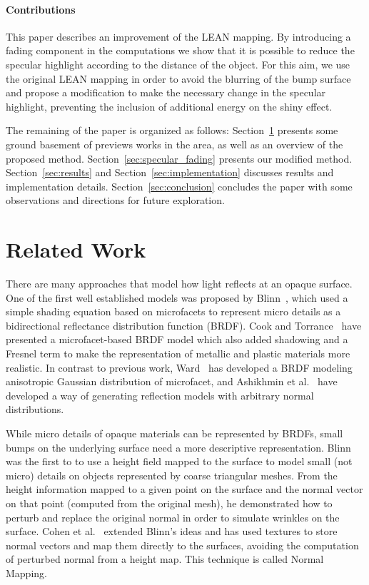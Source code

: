 \documentclass[10pt, conference]{IEEEtran}
\begin{document}
\paragraph*{Contributions}
%
This paper describes an improvement of the LEAN mapping. By introducing a fading component in the computations we show that it is possible to reduce the specular highlight according to the distance of the object. For this aim, we use the original LEAN mapping in order to avoid the blurring of the bump surface and propose a modification to make the necessary change in the specular highlight, preventing the inclusion of additional energy on the shiny effect.

The remaining of the paper is organized as follows: Section~\ref{sec:related_work} presents some ground basement of previews works in the area, as well as an overview of the proposed method. Section~\ref{sec:specular_fading} presents our modified method. Section~\ref{sec:results} and Section~\ref{sec:implementation} discusses results and implementation details. Section~\ref{sec:conclusion} concludes the paper with some observations and directions for future exploration.
\section{Related Work}
\label{sec:related_work}
%
There are many approaches that model how light reflects at an opaque surface. One of the first well established models was proposed by Blinn~\cite{Blinn:1977:MLR:563858.563893}, which used a simple shading equation based on microfacets to represent micro details as a bidirectional reflectance distribution function (BRDF). Cook and Torrance~\cite{Cook:1982:RMC:357290.357293} have presented a microfacet-based BRDF model which also added shadowing and a Fresnel term to make the representation of metallic and plastic materials more realistic. In contrast to previous work, Ward~\cite{Ward:1992:MMA:133994.134078} has developed a BRDF modeling anisotropic Gaussian distribution of microfacet, and Ashikhmin et al.~\cite{Ashikmin:2000:MBG:344779.344814}  have developed a way of generating reflection models with arbitrary normal distributions.

While micro details of opaque materials can be represented by BRDFs, small bumps on the underlying surface need a more descriptive representation. Blinn~\cite{Blinn:1978:SWS:800248.507101} was the first to to use a height field mapped to the surface to model small (not micro) details on objects represented by coarse triangular meshes. From the height information mapped to a given point on the surface and the normal vector on that point (computed from the original mesh), he demonstrated how to perturb and replace the original normal in order to simulate wrinkles on the surface. Cohen et al.~\cite{Cohen:1998:AS:280814.280832} extended Blinn’s ideas and has used textures to store normal vectors and map them directly to the surfaces, avoiding the computation of perturbed normal from a height map. This technique is called Normal Mapping.
\end{document}
